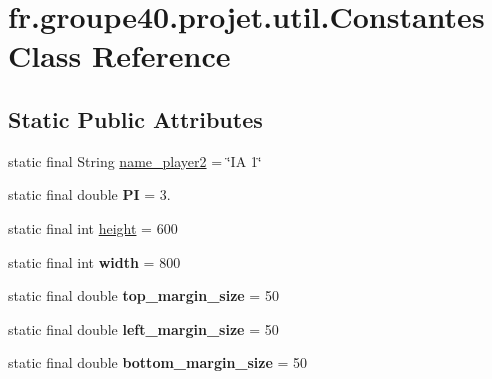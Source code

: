 \hypertarget{classfr_1_1groupe40_1_1projet_1_1util_1_1_constantes}{}\section{fr.\+groupe40.\+projet.\+util.\+Constantes Class Reference}
\label{classfr_1_1groupe40_1_1projet_1_1util_1_1_constantes}
\subsection*{Static Public Attributes}
\begin{DoxyCompactItemize}
\item 
static final String \mbox{\hyperlink{classfr_1_1groupe40_1_1projet_1_1util_1_1_constantes_ab635bb52f76d0eca60948b28f369c44a}{name\+\_\+player2}} = \char`\"{}IA 1\char`\"{}
\item 
\mbox{\label{classfr_1_1groupe40_1_1projet_1_1util_1_1_constantes_a0d653b2ffa1ca80cc1510aa3986f1491}} 
static final double {\bfseries PI} = 3.
\item 
static final int \mbox{\hyperlink{classfr_1_1groupe40_1_1projet_1_1util_1_1_constantes_ab2f05167d177fd89c1251e2dc9d153e6}{height}} = 600
\item 
\mbox{\label{classfr_1_1groupe40_1_1projet_1_1util_1_1_constantes_a11b7ce28d3b08c7c2b041c6ce68e884d}} 
static final int {\bfseries width} = 800
\item 
\mbox{\label{classfr_1_1groupe40_1_1projet_1_1util_1_1_constantes_adb40bbe9bd7532c889179c0cd39c31e1}} 
static final double {\bfseries top\+\_\+margin\+\_\+size} = 50
\item 
\mbox{\label{classfr_1_1groupe40_1_1projet_1_1util_1_1_constantes_a7a7e80ef5b565c110c85173464a3ee98}} 
static final double {\bfseries left\+\_\+margin\+\_\+size} = 50
\item 
\mbox{\label{classfr_1_1groupe40_1_1projet_1_1util_1_1_constantes_add8a472b939e065fe0776dbca5540c96}} 
static final double {\bfseries bottom\+\_\+margin\+\_\+size} = 50

\end{DoxyCompactItemize}
